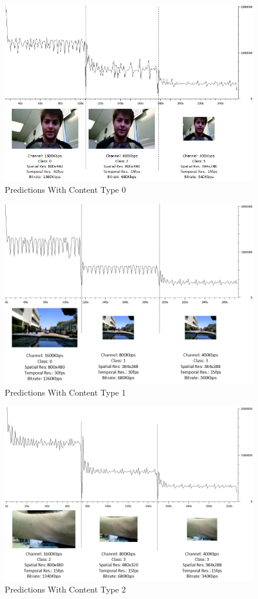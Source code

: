 \begin{figure}[H]
\centering
\includegraphics[width=0.8\linewidth]{images/TrainingExperimentTalkingHead.png}
\caption{Predictions With Content Type 0}
\label{fig:TalkingHead}
\end{figure}
\begin{figure}[H]
\centering
\includegraphics[width=0.8\linewidth]{images/TrainingExperimentSports.png}
\caption{Predictions With Content Type 1}
\label{fig:Sports}
\end{figure}
\begin{figure}[H]
\centering
\includegraphics[width=0.8\linewidth]{images/TrainingExperimentMedical.png}
\caption{Predictions With Content Type 2}
\label{fig:Medical}
\end{figure}
